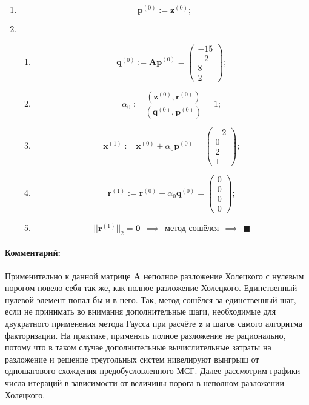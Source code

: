 \begin{enumerate}
    \item $$\mathbf{p}^{(0)} := \mathbf{z}^{(0)};$$

    \item \begin{enumerate}
        \item $$\mathbf{q}^{(0)} :=
        \mathbf{Ap}^{(0)} = \begin{pmatrix} -15\\ -2\\ 8\\ 2 \end{pmatrix};$$

        \item $$\alpha_0 :=
        \dfrac{(\mathbf{z}^{(0)}, \mathbf{r}^{(0)})}{(\mathbf{q}^{(0)}, \mathbf{p}^{(0)})} = 1;$$

        \item $$\mathbf{x}^{(1)} :=
        \mathbf{x}^{(0)}+\alpha_0\mathbf{p}^{(0)} = \begin{pmatrix} -2\\ 0\\ 2\\ 1 \end{pmatrix};$$

         \item $$\mathbf{r}^{(1)} :=
        \mathbf{r}^{(0)}-\alpha_0\mathbf{q}^{(0)} = \begin{pmatrix} 0\\ 0\\ 0 \\ 0 \end{pmatrix};$$

        \item $$||\mathbf{r}^{(1)}||_2 = \mathbf{0} ~~\implies ~~ \text{метод сошёлся} ~~\implies ~~ \blacksquare$$
    \end{enumerate}
\end{enumerate}

\paragraph{Комментарий:} Применительно к данной матрице $\mathbf{A}$ неполное разложение Холецкого с нулевым порогом повело себя так же, как полное разложение Холецкого. Единственный нулевой элемент попал бы и в него. Так, метод сошёлся за единственный шаг, если не принимать во внимания дополнительные шаги, необходимые для двукратного применения метода Гаусса при расчёте $\mathbf{z}$ и шагов самого алгоритма факторизации. На практике, применять полное разложение не рационально, потому что в таком случае дополнительные вычислительные затраты на разложение и решение треугольных систем нивелируют выигрыш от одношагового схождения предобусловленного МСГ. Далее рассмотрим графики числа итераций в зависимости от величины порога в неполном разложении Холецкого.